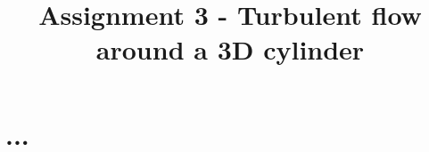 \documentclass[a4paper,english,12pt]{article}
\begin{document}
\title{Assignment 3 - Turbulent flow around a 3D cylinder}
\author{}
\date{}
\maketitle

\section*{...}
\end{document}
